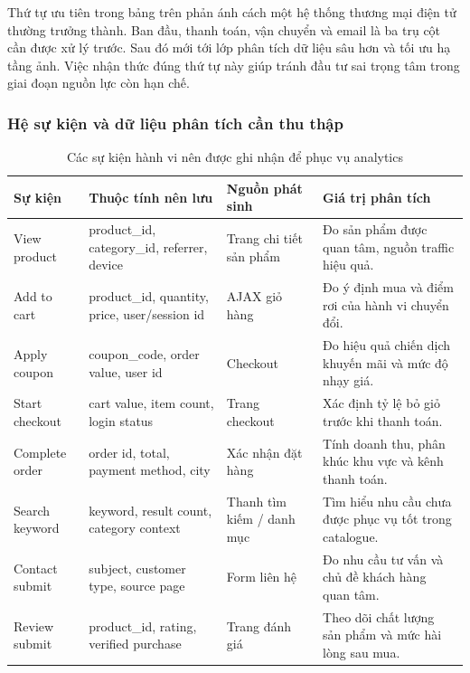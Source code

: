 \documentclass[11pt, a4paper]{article}
\begin{document}
Thứ tự ưu tiên trong bảng trên phản ánh cách một hệ thống thương mại điện tử thường trưởng thành.
Ban đầu, thanh toán, vận chuyển và email là ba trụ cột cần được xử lý trước. Sau đó mới tới lớp
phân tích dữ liệu sâu hơn và tối ưu hạ tầng ảnh. Việc nhận thức đúng thứ tự này giúp tránh đầu tư
sai trọng tâm trong giai đoạn nguồn lực còn hạn chế.

\subsubsection{Hệ sự kiện và dữ liệu phân tích cần thu thập}

\begin{table}[H]
    \centering
    \caption{Các sự kiện hành vi nên được ghi nhận để phục vụ analytics}
    \label{tab:analytics-events}
    \begin{tabularx}{\linewidth}{|>{\raggedright\arraybackslash}p{3.6cm}
                                  |>{\raggedright\arraybackslash}p{3.2cm}
                                  |>{\raggedright\arraybackslash}p{2.8cm}
                                  |Y|}
        \hline
        \textbf{Sự kiện} & \textbf{Thuộc tính nên lưu} & \textbf{Nguồn phát sinh} & \textbf{Giá trị phân tích} \\ \hline
        View product & product\_id, category\_id, referrer, device & Trang chi tiết sản phẩm & Đo sản phẩm được quan tâm, nguồn traffic hiệu quả. \\ \hline
        Add to cart & product\_id, quantity, price, user/session id & AJAX giỏ hàng & Đo ý định mua và điểm rơi của hành vi chuyển đổi. \\ \hline
        Apply coupon & coupon\_code, order value, user id & Checkout & Đo hiệu quả chiến dịch khuyến mãi và mức độ nhạy giá. \\ \hline
        Start checkout & cart value, item count, login status & Trang checkout & Xác định tỷ lệ bỏ giỏ trước khi thanh toán. \\ \hline
        Complete order & order id, total, payment method, city & Xác nhận đặt hàng & Tính doanh thu, phân khúc khu vực và kênh thanh toán. \\ \hline
        Search keyword & keyword, result count, category context & Thanh tìm kiếm / danh mục & Tìm hiểu nhu cầu chưa được phục vụ tốt trong catalogue. \\ \hline
        Contact submit & subject, customer type, source page & Form liên hệ & Đo nhu cầu tư vấn và chủ đề khách hàng quan tâm. \\ \hline
        Review submit & product\_id, rating, verified purchase & Trang đánh giá & Theo dõi chất lượng sản phẩm và mức hài lòng sau mua. \\ \hline
    \end{tabularx}
\end{table}
\end{document}
